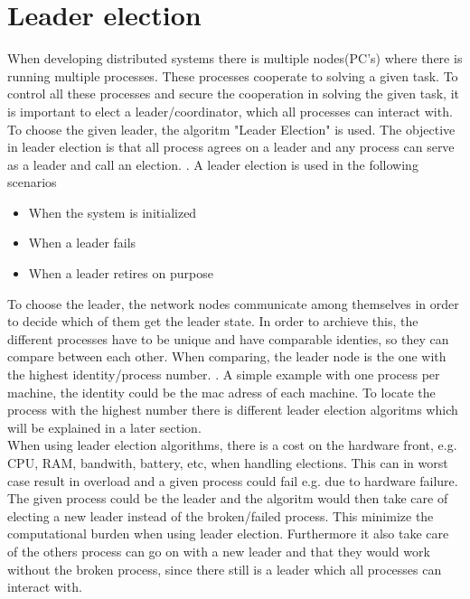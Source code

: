 \documentclass[Main]{subfiles}
\begin{document}
\section{Leader election}
When developing distributed systems there is multiple nodes(PC's) where there is running multiple processes. These processes cooperate to solving a given task. To control all these processes and secure the cooperation in solving the given task, it is important to elect a leader/coordinator, which all processes can interact with. To choose the given leader, the algoritm "Leader Election" is used.  The objective in leader election is that all process agrees on a leader and any process can serve as a leader and call an election. \cite{RMI-slides}. A leader election is used in the following scenarios
\begin{itemize}
\item When the system is initialized
\item When a leader fails
\item When a leader retires on purpose
\end{itemize}
To choose the leader, the network nodes communicate among themselves in order to decide which of them get the leader state. In order to archieve this, the different processes have to be unique and have comparable identies, so they can compare between each other. When comparing, the leader node is the one with the highest identity/process number. \cite{wiki-Leader}. A simple example with one process per machine, the identity could be the mac adress of each machine.\cite{ElectionAlgorithm}
To locate the process with the highest number there is different leader election algoritms which will be explained in a later section. \\

When using leader election algorithms, there is a cost on the hardware front, e.g. CPU, RAM, bandwith, battery, etc, when handling elections.\cite{RMI-slides} This can in worst case result in overload and a given process could fail e.g. due to hardware failure. The given process could be the leader and the algoritm would then take care of electing a new leader instead of the broken/failed process. This minimize the computational burden when using leader election. Furthermore it also take care of the others process can go on with a new leader and that they would work without the broken process, since there still is a leader which all processes can interact with.  \\
\end{document}
